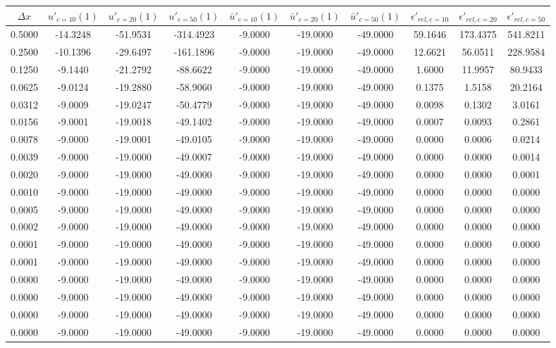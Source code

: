 \begin{tabular}{|c|c|c|c|c|c|c|c|c|c|}
\hline
\textbf{$\Delta x$}&\textbf{$u'_{c=10}(1)$}&\textbf{$u'_{c=20}(1)$}&\textbf{$u'_{c=50}(1)$}&\textbf{$\bar{u}'_{c=10}(1)$}&\textbf{$\bar{u}'_{c=20}(1)$}&\textbf{$\bar{u}'_{c=50}(1)$}&\textbf{$\epsilon'_{rel,c=10}$}&\textbf{$\epsilon'_{rel,c=20}$}&\textbf{$\epsilon'_{rel,c=50}$}\\\hline
0.5000&-14.3248&-51.9531&-314.4923&-9.0000&-19.0000&-49.0000&59.1646&173.4375&541.8211\\\hline
0.2500&-10.1396&-29.6497&-161.1896&-9.0000&-19.0000&-49.0000&12.6621&56.0511&228.9584\\\hline
0.1250&-9.1440&-21.2792&-88.6622&-9.0000&-19.0000&-49.0000&1.6000&11.9957&80.9433\\\hline
0.0625&-9.0124&-19.2880&-58.9060&-9.0000&-19.0000&-49.0000&0.1375&1.5158&20.2164\\\hline
0.0312&-9.0009&-19.0247&-50.4779&-9.0000&-19.0000&-49.0000&0.0098&0.1302&3.0161\\\hline
0.0156&-9.0001&-19.0018&-49.1402&-9.0000&-19.0000&-49.0000&0.0007&0.0093&0.2861\\\hline
0.0078&-9.0000&-19.0001&-49.0105&-9.0000&-19.0000&-49.0000&0.0000&0.0006&0.0214\\\hline
0.0039&-9.0000&-19.0000&-49.0007&-9.0000&-19.0000&-49.0000&0.0000&0.0000&0.0014\\\hline
0.0020&-9.0000&-19.0000&-49.0000&-9.0000&-19.0000&-49.0000&0.0000&0.0000&0.0001\\\hline
0.0010&-9.0000&-19.0000&-49.0000&-9.0000&-19.0000&-49.0000&0.0000&0.0000&0.0000\\\hline
0.0005&-9.0000&-19.0000&-49.0000&-9.0000&-19.0000&-49.0000&0.0000&0.0000&0.0000\\\hline
0.0002&-9.0000&-19.0000&-49.0000&-9.0000&-19.0000&-49.0000&0.0000&0.0000&0.0000\\\hline
0.0001&-9.0000&-19.0000&-49.0000&-9.0000&-19.0000&-49.0000&0.0000&0.0000&0.0000\\\hline
0.0001&-9.0000&-19.0000&-49.0000&-9.0000&-19.0000&-49.0000&0.0000&0.0000&0.0000\\\hline
0.0000&-9.0000&-19.0000&-49.0000&-9.0000&-19.0000&-49.0000&0.0000&0.0000&0.0000\\\hline
0.0000&-9.0000&-19.0000&-49.0000&-9.0000&-19.0000&-49.0000&0.0000&0.0000&0.0000\\\hline
0.0000&-9.0000&-19.0000&-49.0000&-9.0000&-19.0000&-49.0000&0.0000&0.0000&0.0000\\\hline
0.0000&-9.0000&-19.0000&-49.0000&-9.0000&-19.0000&-49.0000&0.0000&0.0000&0.0000\\\hline
\end{tabular}
